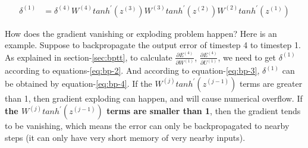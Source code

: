 \documentclass{article}
\begin{document}
\begin{align}\label{eq:bp-4}
\delta^{(1)} &= \delta^{(4)} W^{(4)} tanh^{\prime}(z^{(3)}) W^{(3)} tanh^{\prime}(z^{(2)}) W^{(2)} tanh^{\prime}(z^{(1)})
\end{align}


How does the gradient vanishing or exploding problem happen? Here is an example. 
Suppose to backpropagate the output error of timestep 4 to timestep 1. As explained in section-\ref{sec:bptt},  to calculate $\frac{\partial E^{(4)}}{\partial W^{(1)}}$,  $\frac{\partial E^{(4)}}{\partial U^{(1)}}$, we need to get $\delta^{(1)}$ according to equations-\ref{eq:bp-2}. And according to equation-\ref{eq:bp-3}, $\delta^{(1)}$ can be obtained by equation-\ref{eq:bp-4}. If the $W^{(j)}tanh^{\prime}(z^{(j-1)})$ terms are greater than 1, then gradient exploding can happen, and will cause numerical overflow. If \textbf{the $W^{(j)}tanh^{\prime}(z^{(j-1)})$ terms  are smaller than 1}, 
then the gradient tends to be vanishing, which means the error can only be backpropagated to nearby steps (it can only have very short memory of very nearby inputs). 
\end{document}
